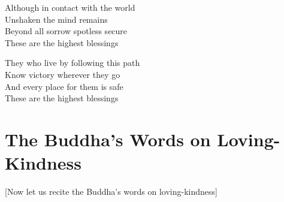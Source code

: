 Although in contact with the world\\
Unshaken the mind remains\\
Beyond all sorrow spotless secure\\
These are the highest blessings

They who live by following this path\\
Know victory wherever they go\\
And every place for them is safe\\
These are the highest blessings

\suttaRef{[Snp 2.4]}


\section{The Buddha's Words on Loving-Kindness}
\label{words-on-loving-kindness}

\begin{center}
  [Now let us recite the Buddha’s words on loving-kindness]
\end{center}

